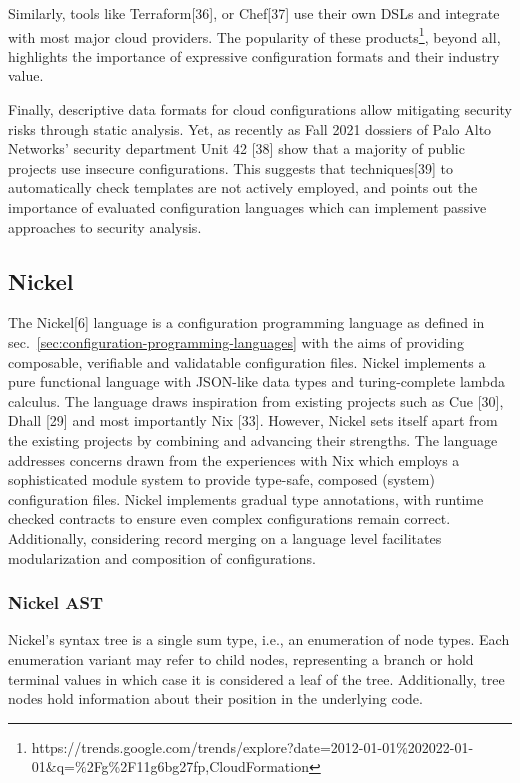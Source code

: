 \documentclass[
  a4paper,
  bibtex,
  english,
  nomenclature]{kthlatex/kththesis/kththesis}
\begin{document}
Similarly, tools like Terraform{[}36{]}, or Chef{[}37{]} use their own
DSLs and integrate with most major cloud providers. The popularity of
these products\footnote{https://trends.google.com/trends/explore?date=2012-01-01\%202022-01-01\&q=\%2Fg\%2F11g6bg27fp,CloudFormation},
beyond all, highlights the importance of expressive configuration
formats and their industry value.

Finally, descriptive data formats for cloud configurations allow
mitigating security risks through static analysis. Yet, as recently as
Fall 2021 dossiers of Palo Alto Networks' security department Unit 42
{[}38{]} show that a majority of public projects use insecure
configurations. This suggests that techniques{[}39{]} to automatically
check templates are not actively employed, and points out the importance
of evaluated configuration languages which can implement passive
approaches to security analysis.

\hypertarget{sec:nickel}{%
\subsection{Nickel}\label{sec:nickel}}

The Nickel{[}6{]} language is a configuration programming language as
defined in sec.~\ref{sec:configuration-programming-languages} with the
aims of providing composable, verifiable and validatable configuration
files. Nickel implements a pure functional language with JSON-like data
types and turing-complete lambda calculus. The language draws
inspiration from existing projects such as Cue {[}30{]}, Dhall {[}29{]}
and most importantly Nix {[}33{]}. However, Nickel sets itself apart
from the existing projects by combining and advancing their strengths.
The language addresses concerns drawn from the experiences with Nix
which employs a sophisticated module system to provide type-safe,
composed (system) configuration files. Nickel implements gradual type
annotations, with runtime checked contracts to ensure even complex
configurations remain correct. Additionally, considering record merging
on a language level facilitates modularization and composition of
configurations.

\hypertarget{sec:nickel-ast}{%
\subsubsection{Nickel AST}\label{sec:nickel-ast}}

Nickel's syntax tree is a single sum type, i.e., an enumeration of node
types. Each enumeration variant may refer to child nodes, representing a
branch or hold terminal values in which case it is considered a leaf of
the tree. Additionally, tree nodes hold information about their position
in the underlying code.
\end{document}
